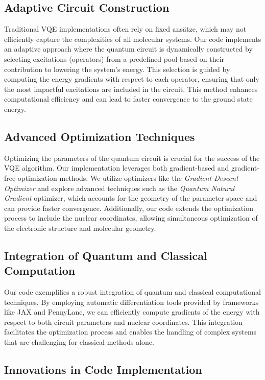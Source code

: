 \subsection*{Adaptive Circuit Construction}

Traditional VQE implementations often rely on fixed ansätze, which may not efficiently capture the complexities of all molecular systems. Our code implements an adaptive approach where the quantum circuit is dynamically constructed by selecting excitations (operators) from a predefined pool based on their contribution to lowering the system's energy. This selection is guided by computing the energy gradients with respect to each operator, ensuring that only the most impactful excitations are included in the circuit. This method enhances computational efficiency and can lead to faster convergence to the ground state energy.

\subsection*{Advanced Optimization Techniques}

Optimizing the parameters of the quantum circuit is crucial for the success of the VQE algorithm. Our implementation leverages both gradient-based and gradient-free optimization methods. We utilize optimizers like the \textit{Gradient Descent Optimizer} and explore advanced techniques such as the \textit{Quantum Natural Gradient} optimizer, which accounts for the geometry of the parameter space and can provide faster convergence. Additionally, our code extends the optimization process to include the nuclear coordinates, allowing simultaneous optimization of the electronic structure and molecular geometry.

\subsection*{Integration of Quantum and Classical Computation}

Our code exemplifies a robust integration of quantum and classical computational techniques. By employing automatic differentiation tools provided by frameworks like JAX and PennyLane, we can efficiently compute gradients of the energy with respect to both circuit parameters and nuclear coordinates. This integration facilitates the optimization process and enables the handling of complex systems that are challenging for classical methods alone.

\subsection*{Innovations in Code Implementation}


